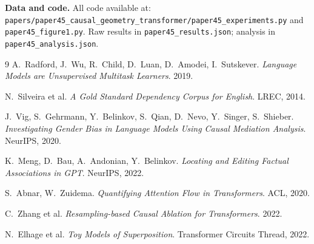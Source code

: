 \documentclass[11pt,a4paper]{article}
\begin{document}
\bigskip
\noindent\textbf{Data and code.}
All code available at:
\texttt{papers/paper45\_causal\_geometry\_transformer/paper45\_experiments.py}
and \texttt{paper45\_figure1.py}.
Raw results in \texttt{paper45\_results.json}; analysis in \texttt{paper45\_analysis.json}.

\begin{thebibliography}{9}
A.\ Radford, J.\ Wu, R.\ Child, D.\ Luan, D.\ Amodei, I.\ Sutskever.
\emph{Language Models are Unsupervised Multitask Learners}. 2019.

N.\ Silveira et al.
\emph{A Gold Standard Dependency Corpus for English}.
LREC, 2014.

J.\ Vig, S.\ Gehrmann, Y.\ Belinkov, S.\ Qian, D.\ Nevo, Y.\ Singer, S.\ Shieber.
\emph{Investigating Gender Bias in Language Models Using Causal Mediation Analysis}.
NeurIPS, 2020.

K.\ Meng, D.\ Bau, A.\ Andonian, Y.\ Belinkov.
\emph{Locating and Editing Factual Associations in GPT}.
NeurIPS, 2022.

S.\ Abnar, W.\ Zuidema.
\emph{Quantifying Attention Flow in Transformers}.
ACL, 2020.

C.\ Zhang et al.
\emph{Resampling-based Causal Ablation for Transformers}. 2022.

N.\ Elhage et al.
\emph{Toy Models of Superposition}.
Transformer Circuits Thread, 2022.
\end{thebibliography}
\end{document}
